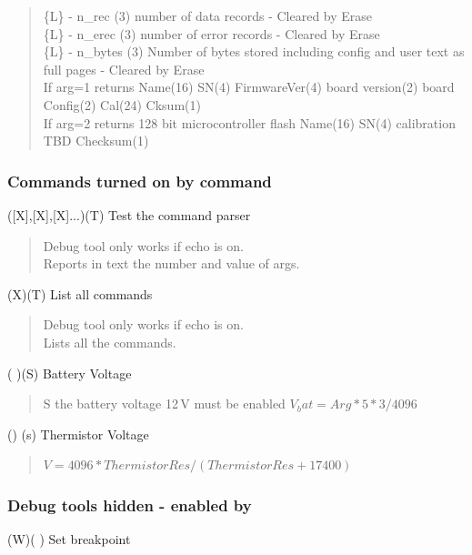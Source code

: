 \begin{quote}
	\{L\} - n\_rec (3) number of data records - Cleared by Erase\\
	\{L\} - n\_erec (3) number of error records - Cleared by Erase\\
	\{L\} - n\_bytes (3) Number of bytes stored including config and user
	text as full pages - Cleared by Erase\\
	If arg=1 returns Name(16) SN(4) FirmwareVer(4) \instType{} board version(2)
	\instType{} board Config(2) Cal(24) Cksum(1)\\
	If arg=2 returns 128 bit microcontroller flash Name(16) SN(4)
	calibration TBD Checksum(1)
\end{quote}


\subsubsection*{Commands turned on by  command }

 ({[}X{]},{[}X{]},{[}X{]}...)(T) Test the command parser
\begin{quote}
	Debug tool only works if echo is on.\\
	Reports in text the number and value of args.\\
\end{quote}

 (X)(T) List all commands
\begin{quote}
	Debug tool only works if echo is on.\\
	Lists all the commands.\\
\end{quote}

 ( )(S) Battery Voltage
\begin{quote}
	S the battery voltage 12\,V must be enabled $V_bat = Arg * 5 * 3 / 4096$\\
\end{quote}

 () (s) Thermistor Voltage
\begin{quote}
	$V= 4096 * Thermistor Res / (Thermistor Res + 17400)$
\end{quote}


\subsubsection*{Debug tools hidden - enabled by }

 (W)( ) Set breakpoint

